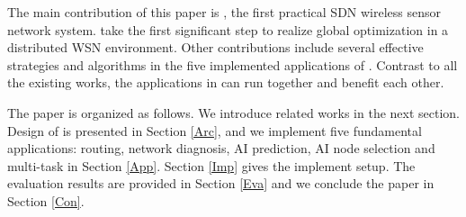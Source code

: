The main contribution of this paper is {\sdn}, the first 
practical SDN wireless sensor network system. 
{\sdn} take the first significant step to realize global optimization in a distributed WSN environment.
Other contributions include several effective strategies and algorithms 
in the five implemented applications of {\sdn}. 
Contrast to all the existing works, the applications in {\sdn}
can run together and benefit each other. 



The paper is organized as follows. We introduce related works in the next section. 
Design of {\sdn} is presented in Section \ref{Arc}, 
and we implement five fundamental applications: routing, network diagnosis, 
AI prediction, AI node selection and multi-task in Section \ref{App}. 
Section \ref{Imp} gives the implement setup.
The evaluation results are provided in Section \ref{Eva} 
and we conclude the paper in Section \ref{Con}.
